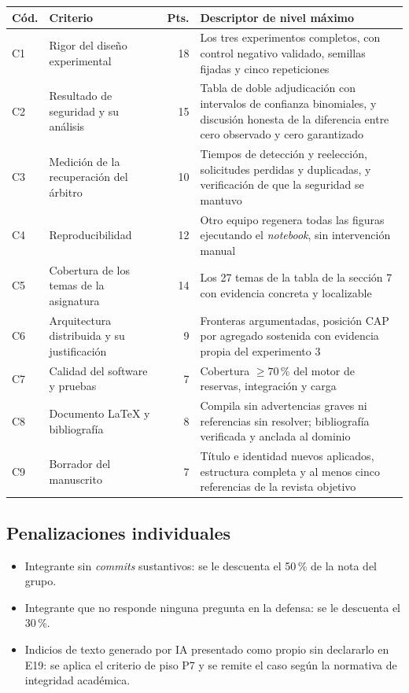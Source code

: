\documentclass[11pt,a4paper]{article}
\begin{document}
\begin{center}
	\small
	\begin{longtable}{@{}p{0.9cm}p{5.6cm}rp{6.6cm}@{}}
		\toprule
		\textbf{Cód.} & \textbf{Criterio} & \textbf{Pts.} & \textbf{Descriptor de nivel máximo} \\
		\midrule
		\endhead
		C1 & Rigor del diseño experimental & 18 & Los tres experimentos completos, con control negativo validado, semillas fijadas y cinco repeticiones \\
		\addlinespace
		C2 & Resultado de seguridad y su análisis & 15 & Tabla de doble adjudicación con intervalos de confianza binomiales, y discusión honesta de la diferencia entre cero observado y cero garantizado \\
		\addlinespace
		C3 & Medición de la recuperación del árbitro & 10 & Tiempos de detección y reelección, solicitudes perdidas y duplicadas, y verificación de que la seguridad se mantuvo \\
		\addlinespace
		C4 & Reproducibilidad & 12 & Otro equipo regenera todas las figuras ejecutando el \emph{notebook}, sin intervención manual \\
		\addlinespace
		C5 & Cobertura de los temas de la asignatura & 14 & Los 27 temas de la tabla de la sección 7 con evidencia concreta y localizable \\
		\addlinespace
		C6 & Arquitectura distribuida y su justificación & 9 & Fronteras argumentadas, posición CAP por agregado sostenida con evidencia propia del experimento 3 \\
		\addlinespace
		C7 & Calidad del software y pruebas & 7 & Cobertura $\geq 70\,\%$ del motor de reservas, integración y carga \\
		\addlinespace
		C8 & Documento LaTeX y bibliografía & 8 & Compila sin advertencias graves ni referencias sin resolver; bibliografía verificada y anclada al dominio \\
		\addlinespace
		C9 & Borrador del manuscrito & 7 & Título e identidad nuevos aplicados, estructura completa y al menos cinco referencias de la revista objetivo \\
		\bottomrule
	\end{longtable}
\end{center}

\subsection{Penalizaciones individuales}

\begin{itemize}[leftmargin=*,itemsep=3pt]
	\item Integrante sin \emph{commits} sustantivos: se le descuenta el 50\,\% de la nota del grupo.
	\item Integrante que no responde ninguna pregunta en la defensa: se le descuenta el 30\,\%.
	\item Indicios de texto generado por IA presentado como propio sin declararlo en E19: se aplica el criterio de piso P7 y se remite el caso según la normativa de integridad académica.
\end{itemize}
\end{document}

